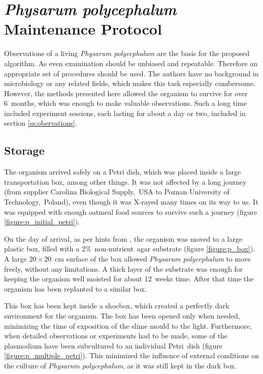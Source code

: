 \documentclass[english,a4paper,twoside]{ppfcmthesis}
\begin{document}
\chapter{\textit{Physarum polycephalum} Maintenance Protocol}
\label{chapter:protocol}
Observations of a living \textit{Physarum polycephalum} are the basis for the proposed algorithm. As even examination should be unbiased and repeatable. Therefore an appropriate set of procedures should be used. The authors have no background in microbiology or any related fields, which makes this task especially cumbersome. However, the methods presented here allowed the organism to survive for over 6~months, which was enough to make valuable observations. Such a long time included experiment sessions, each lasting for about a day or two, included in section \ref{ss:obervations}.


\section*{Storage}

The organism arrived safely on a Petri dish, which was placed inside a large transportation box, among other things. It was not affected by a long journey (from supplier Carolina Biological Supply,~USA to Poznan University of Technology,~Poland), even though it was X-rayed many times on its way to us. It was equipped with enough oatmeal food sources to survive such a journey (figure \ref{figure:p_initial_petri}).

On the day of arrival, as per hints from \cite{adamatzky2010physarum}, the organism was moved to a large plastic box, filled with a 2\%~non-nutrient~agar substrate (figure \ref{figure:p_box}). A large $20\times20$~cm surface of the box allowed \textit{Physarum polycephalum} to move freely, without any limitations. A thick layer of the substrate was enough for keeping the organism well moisted for about 12~weeks time. After that time the organism has been replanted to a similar box.

This box has been kept inside a shoebox, which created a perfectly dark environment for the organism. The box has been opened only when needed, minimizing the time of exposition of the slime mould to the light. Furthermore, when detailed observations or experiments had to be made, some of the plasmodium have been subcultured to an individual Petri~dish (figure \ref{figure:p_multiple_petri}). This minimized the influence of external conditions on the culture of \textit{Physarum polycephalum}, as it was still kept in the dark box.
\end{document}
